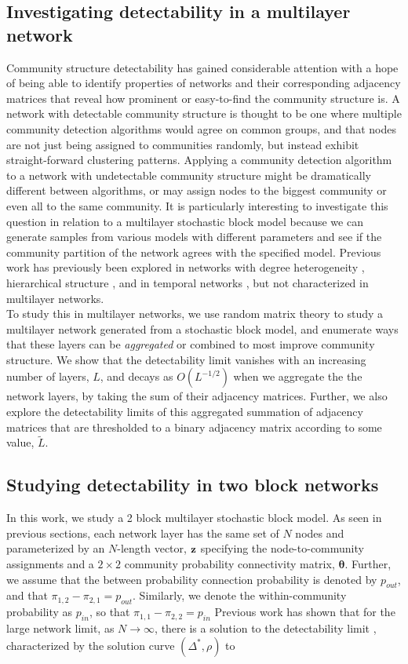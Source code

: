 \subsection{Investigating detectability in a multilayer network}
Community structure detectability has gained considerable attention \cite{detect20,detect21,detect22,detect23,detect24,detect25} with a hope of being able to identify properties of networks and their corresponding adjacency matrices that reveal how prominent or easy-to-find the community structure is. A network with detectable community structure is thought to be one where multiple community detection algorithms would agree on common groups, and that nodes are not just being assigned to communities randomly, but instead exhibit straight-forward clustering patterns. Applying a community detection algorithm to a network with undetectable community structure might be dramatically different between algorithms, or may assign nodes to the biggest community or even all to the same community. It is particularly interesting to investigate this question in relation to a multilayer stochastic block model because we can generate samples from various models with different parameters and see if the community partition of the network agrees with the specified model. Previous work has previously been explored in networks with degree heterogeneity \cite{detectDegreeHetero}, hierarchical structure \cite{peixotoHierarchAttribute,HierarchAttl}, and in temporal networks \cite{detectTemporal}, but not characterized in multilayer networks. \\
\indent To study this in multilayer networks, we use random matrix theory to study a multilayer network generated from a stochastic block model, and enumerate ways that these layers can be \emph{aggregated} or combined to most improve community structure. We show that the detectability limit vanishes with an increasing number of layers, $L$, and decays as $O(L^{-1/2})$ when we aggregate the the network layers, by taking the sum of their adjacency matrices. Further, we also explore the detectability limits of this aggregated summation of adjacency matrices  that are thresholded to a binary adjacency matrix according to some value, $\tilde{L}$.  

\subsection{Studying detectability in two block networks}
In this work, we study a 2 block multilayer stochastic block model. As seen in previous sections, each network layer has the same set of $N$ nodes and parameterized by an $N$-length vector, ${\bf z}$ specifying the node-to-community assignments and a $2 \times 2$ community probability connectivity matrix, ${\boldsymbol \theta}$. Further, we assume that the between probability connection probability is denoted by $p_{out}$, and that $\pi_{1,2}-\pi_{2,1}=p_{out}$. Similarly, we denote the within-community probability as $p_{in}$, so that $\pi_{1,1}-\pi_{2,2}=p_{in}$ Previous work has shown that for the large network limit, as $N \rightarrow \infty$, there is a solution to the detectability limit \cite{detect23,detect24}, characterized by the solution curve $(\Delta^{*},\rho)$ to 


